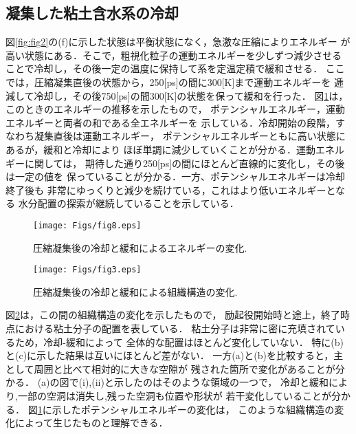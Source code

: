 \subsection{凝集した粘土含水系の冷却}
図\ref{fig:fig2}の(f)に示した状態は平衡状態になく，急激な圧縮によりエネルギー
が高い状態にある．そこで，粗視化粒子の運動エネルギーを少しずつ減少させる
ことで冷却し，その後一定の温度に保持して系を定温定積で緩和させる．
ここでは，圧縮凝集直後の状態から，250[ps]の間に300[K]まで運動エネルギーを
逓減して冷却し，その後750[ps]の間300[K]の状態を保って緩和を行った．
図\ref{fig:fig8}は，このときのエネルギーの推移を示したもので，
ポテンシャルエネルギー，運動エネルギーと両者の和である全エネルギーを
示している．冷却開始の段階，すなわち凝集直後は運動エネルギー，
ポテンシャルエネルギーともに高い状態にあるが，緩和と冷却により
ほぼ単調に減少していくことが分かる．運動エネルギーに関しては，
期待した通り250[ps]の間にほとんど直線的に変化し，その後は一定の値を
保っていることが分かる．一方、ポテンシャルエネルギーは冷却終了後も
非常にゆっくりと減少を続けている，これはより低いエネルギーとなる
水分配置の探索が継続していることを示している．
\begin{figure}[h]
	\begin{center}
	\texttt{[image: Figs/fig8.eps]} 
	\end{center}
	\caption{
		圧縮凝集後の冷却と緩和によるエネルギーの変化.
	} 
	\label{fig:fig8}
\end{figure}
\begin{figure}[h]
	\begin{center}
	\texttt{[image: Figs/fig3.eps]} 
	\end{center}
	\caption{
		圧縮凝集後の冷却と緩和による組織構造の変化.
	} 
	\label{fig:fig3}
\end{figure}
図\ref{fig:fig3}は，この間の組織構造の変化を示したもので，
励起役開始時と途上，終了時点における粘土分子の配置を表している．
粘土分子は非常に密に充填されているため，冷却-緩和によって
全体的な配置はほとんど変化していない．
特に(b)と(c)に示した結果は互いにほとんど差がない．
一方(a)と(b)を比較すると，主として周囲と比べて相対的に大きな空隙が
残された箇所で変化があることが分かる．
(a)の図で(i),(ii)と示したのはそのような領域の一つで，
冷却と緩和により,一部の空洞は消失し,残った空洞も位置や形状が
若干変化していることが分かる．
図\ref{fig:fig8}に示したポテンシャルエネルギーの変化は，
このような組織構造の変化によって生じたものと理解できる．
